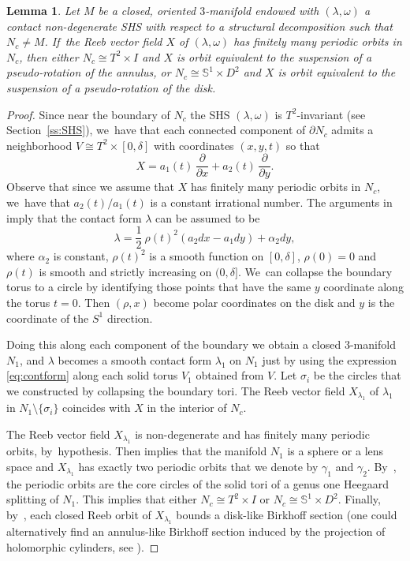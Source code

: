 \documentclass[JEP,XML,SOM,Unicode,NoEqCountersInSection,NoFloatCountersInSection,published]{cedram}
\newcommand{\threemanifold}{$3$\nobreakdash-mani\-fold\xspace}
\newtheorem{lemma}[theorem]{Lemma}
\theoremstyle{definition}
\newcommand{\pp}[2]{\frac{\partial#1}{\partial#2}}
\newcommand{\mS}{\mathbb{S}}
\begin{document}
\begin{lemma}\label{lem:reebpseudo}
Let $M$ be a closed, oriented \threemanifold endowed with $(\lambda,\omega)$ a contact non-degenerate SHS with respect to a structural decomposition such that $N_c\neq M$. If~the Reeb vector field $X$ of $(\lambda, \omega)$ has finitely many periodic orbits in $N_c$, then either $N_c\cong T^2\times I$ and $X$ is orbit equivalent to the suspension of a pseudo-rotation of the annulus, or $N_c\cong \mS^1\times D^2$ and $X$ is orbit equivalent to the suspension of a pseudo-rotation of the disk.
\end{lemma}

\begin{proof}
Since near the boundary of $N_c$ the SHS $(\lambda, \omega)$ is $T^2$-invariant (see Section~\ref{ss:SHS}), we~have that each connected component of $\partial N_c$ admits a neighborhood $V\cong T^2\times [0,\delta]$ with coordinates $(x,y,t)$ so that
\begin{equation}\label{eq:reebinv}
X=a_1(t)\,\pp{}{x} + a_2(t)\, \pp{}{y}.
\end{equation}
{Observe that since we assume that $X$ has finitely many periodic orbits in $N_c$, we~have that $a_2(t)/a_1(t)$ is a constant irrational number. The arguments in \cite[\S 5.2]{HT} imply that the contact form $\lambda$} can be assumed to be
\begin{equation}\label{eq:contform}
\lambda= \frac{1}{2}\ \rho(t)^2 (a_2dx-a_1dy) + \alpha_2 dy,
\end{equation}
where $\alpha_2$ is constant, $\rho(t)^2$ is a smooth function on $[0,\delta]$, $\rho(0)=0$ and $\rho(t)$ is smooth and strictly increasing on $(0,\delta]$. We~can collapse the boundary torus to a circle by identifying those points that have the same $y$ coordinate along the torus $t=0$. Then $(\rho,x)$ become polar coordinates on the disk and $y$ is the coordinate of the $S^1$ direction.

Doing this along each component of the boundary we obtain a closed \threemanifold~$N_1$, and $\lambda$ becomes a smooth contact form $\lambda_1$ on $N_1$ just by using the expression \eqref{eq:contform} along each solid torus $V_1$ obtained from $V$. Let $\sigma_i$ be the circles that we constructed by collapsing the boundary tori. The Reeb vector field $X_{\lambda_1}$ of $\lambda_1$ in $N_1\setminus \{\sigma_i\}$ coincides with $X$ in the interior of $N_c$.

The Reeb vector field $X_{\lambda_1}$ is non-degenerate and has finitely many periodic orbits, by~hypothesis. Then \cite[Th.\,1.2]{CDR} implies that the manifold $N_1$ is a sphere or a lens space and $X_{\lambda_1}$ has exactly two periodic orbits that we denote by $\gamma_1$ and $\gamma_2$. By~\cite[Th.\,1.2]{HT}, the periodic orbits are the core circles of the solid tori of a genus one Heegaard splitting of $N_1$. This implies that either $N_c\cong T^2\times I$ or $N_c \cong \mS^1 \times D^2$. Finally, by~\cite[Cor.\,1.10]{CGHHL}, each closed Reeb orbit of $X_{\lambda_1}$ bounds a disk-like Birkhoff section (one could alternatively find an annulus-like Birkhoff section induced by the projection of holomorphic cylinders, see \cite[\S 4.6]{HT}).


\end{proof}
\end{document}
